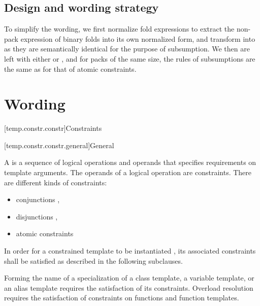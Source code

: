 \documentclass{wg21}
\begin{document}
\subsection{Design and wording strategy}

To simplify the wording, we first normalize fold expressions to extract the non-pack expression of binary folds into its own normalized form,
and transform  into  as they are semantically identical for the purpose of subsumption.
We then are left with either  or , and for packs of the same size, the rules of subsumptions are the same as for that of atomic constraints.

\section{Wording}

[temp.constr.constr]{Constraints}

[temp.constr.constr.general]{General}

%

\pnum
A  is a sequence of logical operations and
operands that specifies requirements on template arguments.
The operands of a logical operation are constraints.
There are  different kinds of constraints:
\begin{itemize}
    \item conjunctions ,
    \item disjunctions , 
    \item atomic constraints 
\end{itemize}

\pnum
In order for a constrained template to be instantiated ,
its associated constraints 
shall be satisfied as described in the following subclauses.
\begin{note}
    Forming the name of a specialization of
    a class template,
    a variable template, or
    an alias template 
    requires the satisfaction of its constraints.
    Overload resolution 
    requires the satisfaction of constraints
    on functions and function templates.
\end{note}
\end{document}
